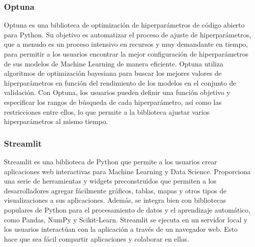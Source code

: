 \subsubsection{Optuna}
Optuna es una biblioteca de optimización de hiperparámetros de código abierto para Python. Su objetivo 
es automatizar el proceso de ajuste de hiperparámetros, que a menudo es un proceso intensivo en 
recursos y muy demandante en tiempo, para permitir a los usuarios encontrar la mejor configuración 
de hiperparámetros de sus modelos de Machine Learning de manera eficiente. Optuna utiliza algoritmos 
de optimización bayesiana para buscar los mejores valores de hiperparámetros en función del 
rendimiento de los modelos en el conjunto de validación. Con Optuna, los usuarios pueden definir una función 
objetivo y especificar los rangos de búsqueda de cada hiperparámetro, así como las restricciones entre ellos, 
lo que permite a la biblioteca ajustar varios hiperparámetros al mismo tiempo.

\subsubsection{Streamlit}
Streamlit es una biblioteca de Python que permite a los usuarios crear aplicaciones web interactivas
para Machine Learning y Data Science. Proporciona una serie de herramientas y widgets preconstruidos 
que permiten a los desarrolladores agregar fácilmente gráficos, tablas, mapas y otros tipos de 
visualizaciones a sus aplicaciones. Además, se integra bien con bibliotecas populares de Python 
para el procesamiento de datos y el aprendizaje automático, como Pandas, NumPy y Scikit-Learn.
Streamlit se ejecuta en un servidor local y los usuarios interactúan con la aplicación a través 
de un navegador web. Esto hace que sea fácil compartir aplicaciones y colaborar en ellas.